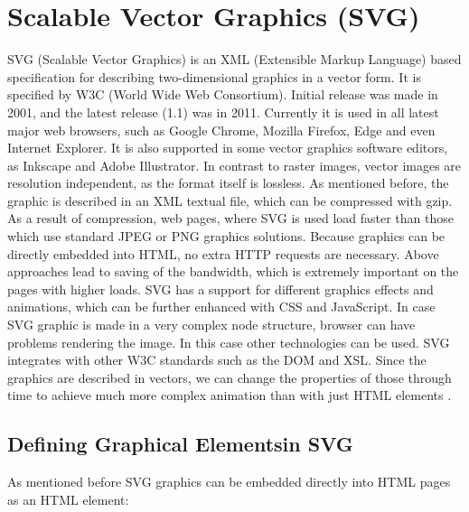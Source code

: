 %
%
% 
% 
% 


\section{Scalable Vector Graphics (SVG)}
\label{sect:SVG}
SVG (Scalable Vector Graphics) is an XML (Extensible Markup Language) based 
specification for describing two-dimensional graphics in a vector form. It is 
specified by W3C (World Wide Web Consortium). Initial release was made in 2001, 
and the latest release (1.1) was in 2011. Currently it is used in all latest 
major web browsers, such as Google Chrome, Mozilla Firefox, Edge and even Internet 
Explorer. It is also supported in some vector graphics software editors, as Inkscape and Adobe 
Illustrator. In contrast to raster images, vector images are resolution 
independent, as the format itself is lossless. As mentioned before, the graphic 
is described in an XML textual file, which can be compressed with gzip. As a 
result of compression, web pages, where SVG is used load faster than those 
which use standard JPEG or PNG graphics solutions. Because graphics can be 
directly embedded into HTML, no extra HTTP requests are necessary. Above 
approaches lead to saving of the bandwidth, which is extremely important on the 
pages with higher loads. SVG has a support for different graphics effects and 
animations, which can be further enhanced with CSS and JavaScript. In case SVG 
graphic is made in a very complex node structure, browser can have problems 
rendering the image. In this case other technologies can be used. SVG 
integrates with other W3C standards such as the DOM and XSL. Since the graphics 
are described in vectors, we can change the properties of those through time to 
achieve much more complex animation than with just HTML elements 
\citep{w3schoolSVG}. 

\subsection{Defining Graphical Elementsin SVG} %
\label{sub:SVG_basic_elemnts}
As mentioned before SVG graphics can be embedded directly into HTML pages as an 
HTML element:

